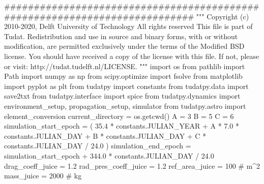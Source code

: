 {}
\markdownRendererSectionEnd 
\markdownRendererSectionEnd \markdownRendererSectionBegin
\markdownRendererHeadingOne{}\markdownRendererInterblockSeparator
{}
\markdownRendererSectionEnd \markdownRendererSectionBegin
{}\markdownRendererInterblockSeparator
{}
\markdownRendererSectionEnd \markdownRendererSectionBegin
\markdownRendererHeadingOne{}\markdownRendererInterblockSeparator
{}
\markdownRendererSectionEnd \markdownRendererSectionBegin
{}\markdownRendererInterblockSeparator
{}
\markdownRendererSectionEnd \markdownRendererSectionBegin
\markdownRendererHeadingOne{}\markdownRendererInterblockSeparator
{}########################################################################### """ Copyright (c) 2010-2020, Delft University of Technology All rights reserved This file is part of Tudat. Redistribution and use in source and binary forms, with or without modification, are permitted exclusively under the terms of the Modified BSD license. You should have received a copy of the license with this file. If not, please or visit: http://tudat.tudelft.nl/LICENSE. """ import os from pathlib import Path import numpy as np from scipy.optimize import fsolve from matplotlib import pyplot as plt from tudatpy import constants from tudatpy.data import save2txt from tudatpy.interface import spice from tudatpy.dynamics import environment_setup, propagation_setup, simulator from tudatpy.astro import element_conversion\markdownRendererInterblockSeparator
{}
\markdownRendererSectionEnd \markdownRendererSectionBegin
{}\markdownRendererInterblockSeparator
{}current_directory = os.getcwd()\markdownRendererInterblockSeparator
{}
\markdownRendererSectionEnd \markdownRendererSectionBegin
{}\markdownRendererInterblockSeparator
{}A = 3 B = 5 C = 6 simulation_start_epoch = ( 35.4 * constants.JULIAN_YEAR + A * 7.0 * constants.JULIAN_DAY + B * constants.JULIAN_DAY + C * constants.JULIAN_DAY / 24.0 ) simulation_end_epoch = simulation_start_epoch + 344.0 * constants.JULIAN_DAY / 24.0\markdownRendererInterblockSeparator
{}
\markdownRendererSectionEnd \markdownRendererSectionBegin
{}\markdownRendererInterblockSeparator
{}
\markdownRendererSectionEnd \markdownRendererSectionBegin
{}\markdownRendererInterblockSeparator
{}drag_coeff_juice = 1.2 rad_pres_coeff_juice = 1.2 ref_area_juice = 100 # m^2 mass_juice = 2000 # kg\markdownRendererInterblockSeparator

